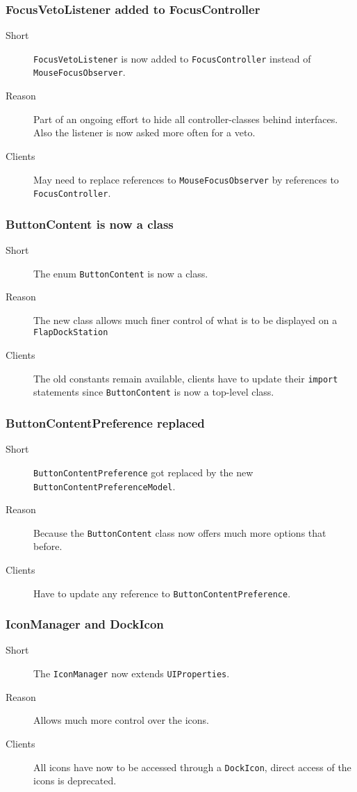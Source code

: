 \documentclass[a4paper,10pt]{article}
\newcommand{\src}[1]{\lstinline[basicstyle=\normalsize\ttfamily,keywordstyle=\normalsize\ttfamily,identifierstyle=\normalsize\ttfamily]|#1|}
\newcommand{\short}{\item[Short]}
\newcommand{\why}{\item[Reason]}
\newcommand{\clients}{\item[Clients]}
\begin{document}
\subsubsection{FocusVetoListener added to FocusController}
\begin{description}
 \short \src{FocusVetoListener} is now added to \src{FocusController} instead of \linebreak \src{MouseFocusObserver}.
 \why Part of an ongoing effort to hide all controller-classes behind interfaces. Also the listener is now asked more often for a veto.
 \clients May need to replace references to \src{MouseFocusObserver} by references to \src{FocusController}.
\end{description}

\subsubsection{ButtonContent is now a class}
\begin{description}
 \short The enum \src{ButtonContent} is now a class.
 \why The new class allows much finer control of what is to be displayed on a \src{FlapDockStation}
 \clients The old constants remain available, clients have to update their \src{import} statements  since \src{ButtonContent} is now a top-level class.
\end{description}

\subsubsection{ButtonContentPreference replaced}
\begin{description}
 \short \src{ButtonContentPreference} got replaced by the new \linebreak \src{ButtonContentPreferenceModel}.
 \why Because the \src{ButtonContent} class now offers much more options that before.
 \clients Have to update any reference to \src{ButtonContentPreference}.
\end{description}

\subsubsection{IconManager and DockIcon}
\begin{description}
 \short The \src{IconManager} now extends \src{UIProperties}.
 \why Allows much more control over the icons.
 \clients All icons have now to be accessed through a \src{DockIcon}, direct access of the icons is deprecated.
\end{description}
\end{document}
